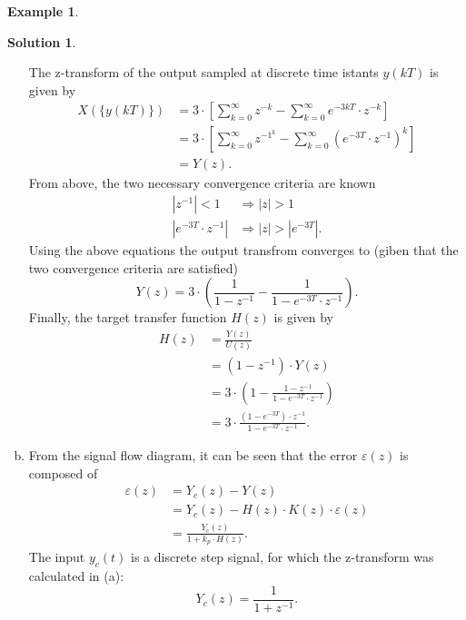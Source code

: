\documentclass[a4paper,12 pt]{article}
\numberwithin{equation}{section}
\theoremstyle{definition}
\newtheorem{bsp}{Example}
\theoremstyle{remark}
\theoremstyle{definition}
\newtheorem*{lsg}{Solution}
\theoremstyle{definition}
\theoremstyle{definition}
\theoremstyle{remark}
\begin{document}
\begin{bsp}
\begin{lsg}
\begin{enumerate}[(a)]
The z-transform of the output sampled at discrete time istants $y(kT)$ is given by
\begin{equation*}
\begin{split}
X(\{ y(kT)\})&=3\cdot \left[ \sum_{k=0}^{\infty}z^{-k}-\sum_{k=0}^\infty e^{-3kT} \cdot z^{-k}\right]\\
&=3\cdot \left[ \sum_{k=0}^{\infty}z^{-1}^k-\sum_{k=0}^\infty (e^{-3T} \cdot z^{-1})^k\right]\\
&=Y(z).
\end{split}
\end{equation*}
From above, the two necessary convergence criteria are known
\begin{equation*}
\begin{split}
|z^{-1}|<1 &\Rightarrow |z|>1\\
|e^{-3T}\cdot z^{-1}|&\Rightarrow |z|>|e^{-3T}|.
\end{split}
\end{equation*}
Using the above equations the output transfrom converges to (giben that the two convergence criteria are satisfied)
\begin{equation*}
Y(z)=3\cdot \left( \frac{1}{1-z^{-1}}-\frac{1}{1-e^{-3T}\cdot z^{-1}} \right).
\end{equation*}
Finally, the target transfer function $H(z)$ is given by
\begin{equation*}
\begin{split}
H(z)&=\frac{Y(z)}{U(z)}\\
&=(1-z^{-1})\cdot Y(z)\\
&=3\cdot \left( 1-\frac{1-z^{-1}}{1-e^{-3T}\cdot z^{-1}} \right)\\
&=3\cdot \frac{(1-e^{-3T})\cdot z^{-1}}{1-e^{-3T}\cdot z^{-1}}.
\end{split}
\end{equation*}
\item From the signal flow diagram, it can be seen that the error $\varepsilon(z)$ is composed of 
\begin{equation*}
\begin{split}
\varepsilon(z)&=Y_c(z)-Y(z)\\
&=Y_c(z)-H(z)\cdot K(z)\cdot \varepsilon(z)\\
&=\frac{Y_c(z)}{1+k_p\cdot H(z)}.
\end{split}
\end{equation*}
The input $y_c(t)$ is a discrete step signal, for which the z-transform was calculated in (a):
\begin{equation*}
Y_c(z)=\frac{1}{1+z^{-1}}.

\end{equation*}
\end{enumerate}
\end{lsg}
\end{bsp}
\end{document}
